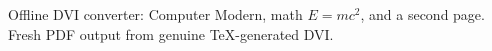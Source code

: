 \documentclass{article}
\begin{document}
Offline DVI converter: Computer Modern, math $E=mc^2$, and a second page.
\newpage
Fresh PDF output from genuine TeX-generated DVI.
\end{document}
